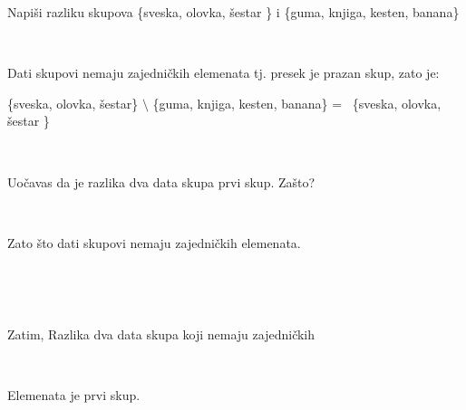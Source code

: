    \begin{zad} 

        Napi\v si razliku skupova \{sveska, olovka, \v sestar \} i \{guma, knjiga, kesten, banana\} 

        \ 

        

          Dati skupovi nemaju zajedni\v ckih elemenata tj. presek je prazan skup, zato je: \

          

          \{sveska, olovka, \v sestar\} $\setminus$ \{guma, knjiga, kesten, banana\} = \ \{sveska, olovka, \v sestar \}

        \  

        

        Uo\v cavas da je razlika dva data skupa prvi skup. Za\v sto? 

        \ 

        Zato \v sto dati skupovi nemaju zajedni\v ckih elemenata.

        \ 

        \ 

        Zatim, Razlika dva data skupa koji nemaju zajedni\v ckih 

        \ 

        Elemenata je prvi skup.

        \

    \end{zad}

